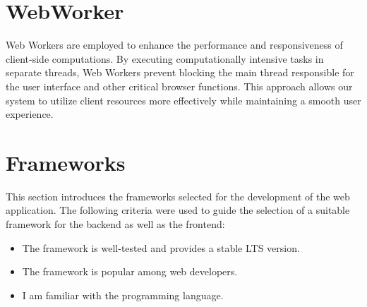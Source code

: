 \cite{methodology:websockets1, methodology:websockets2, methodology:websockets3}

\section{WebWorker}
\label{sec:methodology:webworker}
Web Workers are employed to enhance the performance and responsiveness of client-side computations. By executing computationally intensive tasks in separate threads, Web Workers prevent blocking the main thread responsible for the user interface and other critical browser functions. This approach allows our system to utilize client resources more effectively while maintaining a smooth user experience.

\cite{methodology:webworkers}

\section{Frameworks}
\label{sec:methodology:frameworks}
This section introduces the frameworks selected for the development of the web application. The following criteria were used to guide the selection of a suitable framework for the backend as well as the frontend:
\begin{itemize}
    \item The framework is well-tested and provides a stable \ac{LTS} version.
    \item The framework is popular among web developers.
    \item I am familiar with the programming language.
\end{itemize}

